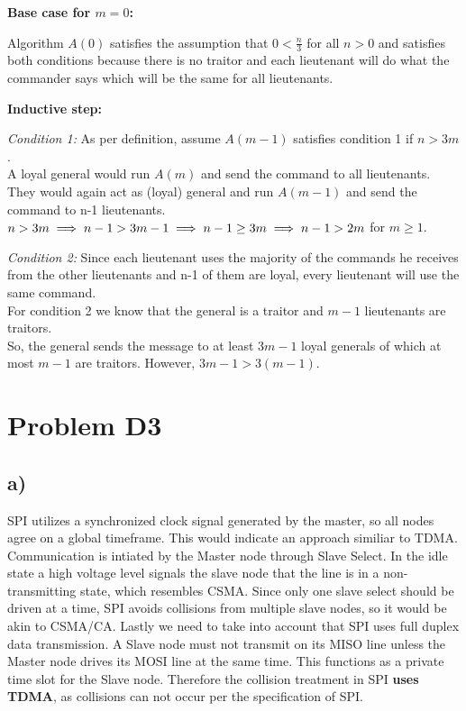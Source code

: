 \documentclass[12pt]{article}
\begin{document}
\textbf{Base case for $m=0$:} 

Algorithm $A(0)$ satisfies the assumption that $0 < \frac{n}{3}$ for all $n>0$ and satisfies both conditions because there is no traitor and each lieutenant will do what the commander says which will be the same for all lieutenants.

\textbf{Inductive step:}

\textit{Condition 1:} As per definition, assume $A(m-1)$ satisfies condition 1 if $n > 3m$.\\
A loyal general would run $A(m)$ and send the command to all lieutenants.\\
They would again act as (loyal) general and run $A(m-1)$ and send the command to n-1 lieutenants.\\
$n>3m\\
\implies n-1>3m-1 \\
\implies n-1\geq3m \\
\implies n-1>2m$ for $m\geq1$.

\textit{Condition 2:} Since each lieutenant uses the majority of the commands he receives from the other lieutenants and n-1 of them are loyal, every lieutenant will use the same command.\\
For condition 2 we know that the general is a traitor and $m-1$ lieutenants are traitors.\\
So, the general sends the message to at least $3m-1$ loyal generals of which at most $m-1$ are traitors. However, $3m-1 > 3(m-1)$. 

\section*{Problem D3}
\subsection*{a)}
SPI utilizes a synchronized clock signal generated by the master, so all nodes agree on a global timeframe. This would indicate an approach similiar to TDMA. Communication is intiated by the Master node through Slave Select. In the idle state a high voltage level signals the slave node that the line is in a non-transmitting state, which resembles CSMA. Since only one slave select should be driven at a time, SPI avoids collisions from multiple slave nodes, so it would be akin to CSMA/CA. 
Lastly we need to take into account that SPI uses full duplex data transmission. A Slave node must not transmit on its MISO line unless the Master node drives its MOSI line at the same time. This functions as a private time slot for the Slave node.
Therefore the collision treatment in SPI \textbf{uses TDMA}, as collisions can not occur per the specification of SPI.
\end{document}
